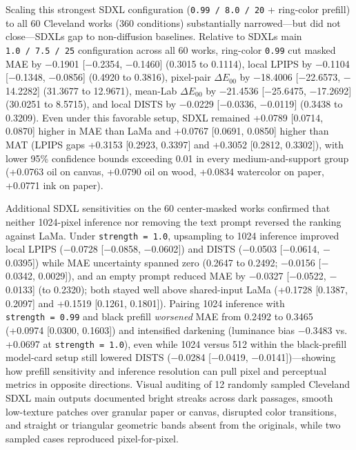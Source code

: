 \documentclass[applsci,article,submit,pdftex,moreauthors]{Definitions/mdpi}
\begin{document}
Scaling this strongest SDXL configuration (\texttt{0.99\ /\ 8.0\ /\ 20} + ring-color prefill) to all 60 Cleveland works (360 conditions) substantially narrowed---but did not close---SDXL\textquotesingle s gap to non-diffusion baselines. Relative to SDXL\textquotesingle s main \texttt{1.0\ /\ 7.5\ /\ 25} configuration across all 60 works, ring-color \texttt{0.99} cut masked MAE by \ensuremath{-}0.1901 {[}\ensuremath{-}0.2354, \ensuremath{-}0.1460{]} (0.3015 to 0.1114), local LPIPS by \ensuremath{-}0.1104 {[}\ensuremath{-}0.1348, \ensuremath{-}0.0856{]} (0.4920 to 0.3816), pixel-pair \texttt{\ensuremath{\Delta E_{00}}} by \ensuremath{-}18.4006 {[}\ensuremath{-}22.6573, \ensuremath{-}14.2282{]} (31.3677 to 12.9671), mean-Lab \texttt{\ensuremath{\Delta E_{00}}} by \ensuremath{-}21.4536 {[}\ensuremath{-}25.6475, \ensuremath{-}17.2692{]} (30.0251 to 8.5715), and local DISTS by \ensuremath{-}0.0229 {[}\ensuremath{-}0.0336, \ensuremath{-}0.0119{]} (0.3438 to 0.3209). Even under this favorable setup, SDXL remained +0.0789 {[}0.0714, 0.0870{]} higher in MAE than LaMa and +0.0767 {[}0.0691, 0.0850{]} higher than MAT (LPIPS gaps +0.3153 {[}0.2923, 0.3397{]} and +0.3052 {[}0.2812, 0.3302{]}), with lower 95\% confidence bounds exceeding 0.01 in every medium-and-support group (+0.0763 oil on canvas, +0.0790 oil on wood, +0.0834 watercolor on paper, +0.0771 ink on paper).

Additional SDXL sensitivities on the 60 center-masked works confirmed that neither 1024-pixel inference nor removing the text prompt reversed the ranking against LaMa. Under \texttt{strength\ =\ 1.0}, upsampling to 1024 inference improved local LPIPS (\ensuremath{-}0.0728 {[}\ensuremath{-}0.0858, \ensuremath{-}0.0602{]}) and DISTS (\ensuremath{-}0.0503 {[}\ensuremath{-}0.0614, \ensuremath{-}0.0395{]}) while MAE uncertainty spanned zero (0.2647 to 0.2492; \ensuremath{-}0.0156 {[}\ensuremath{-}0.0342, 0.0029{]}), and an empty prompt reduced MAE by \ensuremath{-}0.0327 {[}\ensuremath{-}0.0522, \ensuremath{-}0.0133{]} (to 0.2320); both stayed well above shared-input LaMa (+0.1728 {[}0.1387, 0.2097{]} and +0.1519 {[}0.1261, 0.1801{]}). Pairing 1024 inference with \texttt{strength\ =\ 0.99} and black prefill \emph{worsened} MAE from 0.2492 to 0.3465 (+0.0974 {[}0.0300, 0.1603{]}) and intensified darkening (luminance bias \ensuremath{-}0.3483 vs. +0.0697 at \texttt{strength\ =\ 1.0}), even while 1024 versus 512 within the black-prefill model-card setup still lowered DISTS (\ensuremath{-}0.0284 {[}\ensuremath{-}0.0419, \ensuremath{-}0.0141{]})---showing how prefill sensitivity and inference resolution can pull pixel and perceptual metrics in opposite directions. Visual auditing of 12 randomly sampled Cleveland SDXL main outputs documented bright streaks across dark passages, smooth low-texture patches over granular paper or canvas, disrupted color transitions, and straight or triangular geometric bands absent from the originals, while two sampled cases reproduced pixel-for-pixel.
\end{document}
